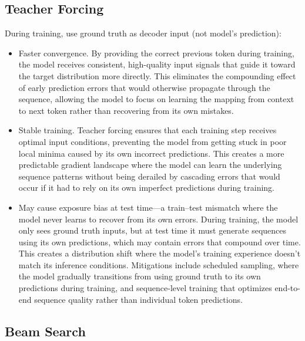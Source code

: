 \subsection{Teacher Forcing}

During training, use ground truth as decoder input (not model's prediction):
\begin{itemize}
    \item Faster convergence. By providing the correct previous token during training, the model receives consistent, high-quality input signals that guide it toward the target distribution more directly. This eliminates the compounding effect of early prediction errors that would otherwise propagate through the sequence, allowing the model to focus on learning the mapping from context to next token rather than recovering from its own mistakes.
    
    \item Stable training. Teacher forcing ensures that each training step receives optimal input conditions, preventing the model from getting stuck in poor local minima caused by its own incorrect predictions. This creates a more predictable gradient landscape where the model can learn the underlying sequence patterns without being derailed by cascading errors that would occur if it had to rely on its own imperfect predictions during training.
    
    \item May cause exposure bias at test time—a train–test mismatch where the model never learns to recover from its own errors. During training, the model only sees ground truth inputs, but at test time it must generate sequences using its own predictions, which may contain errors that compound over time. This creates a distribution shift where the model's training experience doesn't match its inference conditions. Mitigations include scheduled sampling, where the model gradually transitions from using ground truth to its own predictions during training, and sequence-level training that optimizes end-to-end sequence quality rather than individual token predictions.
\end{itemize}

\subsection{Beam Search}

